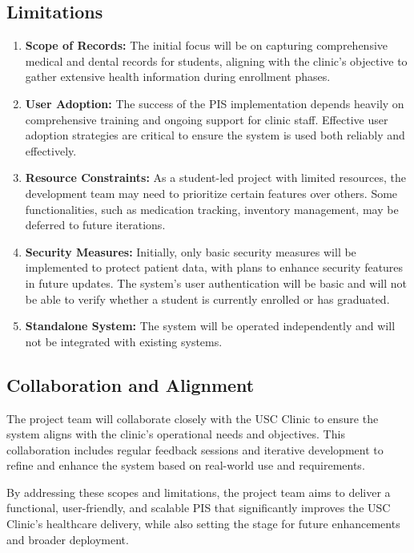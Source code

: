 \subsection{Limitations}
\begin{enumerate}
    \item \textbf{Scope of Records:} The initial focus will be on capturing comprehensive medical and dental records for students, aligning with the clinic's objective to gather extensive health information during enrollment phases.
    \item \textbf{User Adoption:} The success of the PIS implementation depends heavily on comprehensive training and ongoing support for clinic staff. Effective user adoption strategies are critical to ensure the system is used both reliably and effectively.
    \item \textbf{Resource Constraints:} As a student-led project with limited resources, the development team may need to prioritize certain features over others. Some functionalities, such as medication tracking, inventory management, may be deferred to future iterations.
    \item \textbf{Security Measures:} Initially, only basic security measures will be implemented to protect patient data, with plans to enhance security features in future updates. The system's user authentication will be basic and will not be able to verify whether a student is currently enrolled or has graduated.
    \item \textbf{Standalone System:} The system will be operated independently and will not be integrated with existing systems.
\end{enumerate}

\subsection{Collaboration and Alignment}

The project team will collaborate closely with the USC Clinic to ensure the system aligns with the clinic’s operational needs and objectives. This collaboration includes regular feedback sessions and iterative development to refine and enhance the system based on real-world use and requirements.

By addressing these scopes and limitations, the project team aims to deliver a functional, user-friendly, and scalable PIS that significantly improves the USC Clinic’s healthcare delivery, while also setting the stage for future enhancements and broader deployment.
